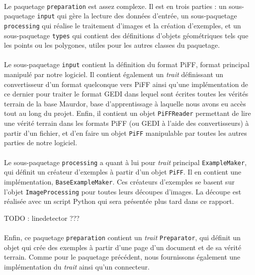 \paragraph{}
Le paquetage \texttt{preparation} est assez complexe. Il est en trois parties : un sous-paquetage \texttt{input} qui gère la lecture des données d'entrée, un sous-paquetage \texttt{processing} qui réalise le traitement d'images et la création d'exemples, et un sous-paquetage \texttt{types} qui contient des définitions d'objets géométriques tels que les points ou les polygones, utiles pour les autres classes du paquetage.

\paragraph{}
Le sous-paquetage \texttt{input} contient la définition du format PiFF, format principal manipulé par notre logiciel. Il contient également un \textit{trait} définissant un convertisseur d'un format quelconque vers PiFF ainsi qu'une implémentation de ce dernier pour traiter le format GEDI dans lequel sont écrites toutes les vérités terrain de la base Maurdor, base d'apprentissage à laquelle nous avons eu accès tout au long du projet. Enfin, il contient un objet \texttt{PiFFReader} permettant de lire une vérité terrain dans les formats PiFF (ou GEDI à l'aide des convertisseurs) à partir d'un fichier, et d'en faire un objet \texttt{PiFF} manipulable par toutes les autres parties de notre logiciel.

\paragraph{}
Le sous-paquetage \texttt{processing} a quant à lui pour \textit{trait} principal \texttt{ExampleMaker}, qui définit un créateur d'exemples à partir d'un objet \texttt{PiFF}. Il en contient une implémentation, \texttt{BaseExampleMaker}. Ces créateurs d'exemples se basent sur l'objet \texttt{ImageProcessing} pour toutes leurs découpes d'images. La découpe est réalisée avec un script Python qui sera présentée plus tard dans ce rapport.

TODO : linedetector ???

\paragraph{}
Enfin, ce paquetage \texttt{preparation} contient un \textit{trait} \texttt{Preparator}, qui définit un objet qui crée des exemples à partir d'une page d'un document et de sa vérité terrain. Comme pour le paquetage précédent, nous fournissons également une implémentation du \textit{trait} ainsi qu'un connecteur.

